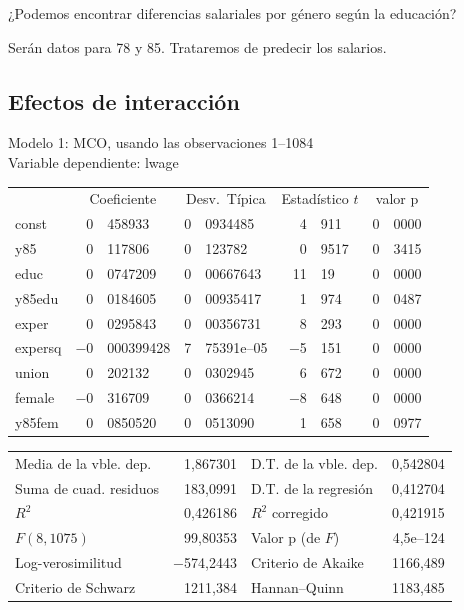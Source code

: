 \begin{center}
    ¿Podemos encontrar diferencias salariales por género según la educación?
\end{center}

Serán datos para 78 y 85. Trataremos de predecir los salarios.

\subsection{Efectos de interacción}


\begin{center}

Modelo 1: MCO, usando las observaciones 1--1084\\
Variable dependiente: lwage\\

\vspace{1em}

\begin{tabular}{lr@{,}lr@{,}lr@{,}lr@{,}l}
  &
 \multicolumn{2}{c}{Coeficiente} &
  \multicolumn{2}{c}{Desv.\ Típica} &
   \multicolumn{2}{c}{Estadístico $t$} &
    \multicolumn{2}{c}{valor p} \\[1ex]
const &
  0&458933 &
    0&0934485 &
      4&911 &
        0&0000 \\
y85 &
  0&117806 &
    0&123782 &
      0&9517 &
        0&3415 \\
educ &
  0&0747209 &
    0&00667643 &
      11&19 &
        0&0000 \\
y85edu &
  0&0184605 &
    0&00935417 &
      1&974 &
        0&0487 \\
exper &
  0&0295843 &
    0&00356731 &
      8&293 &
        0&0000 \\
expersq &
  $-$0&000399428 &
    7&75391\textrm{e--05} &
      $-$5&151 &
        0&0000 \\
union &
  0&202132 &
    0&0302945 &
      6&672 &
        0&0000 \\
female &
  $-$0&316709 &
    0&0366214 &
      $-$8&648 &
        0&0000 \\
y85fem &
  0&0850520 &
    0&0513090 &
      1&658 &
        0&0977 \\
\end{tabular}

\vspace{1ex}
\begin{tabular}{lrlr}
Media de la vble. dep. &  1,867301 & D.T. de la vble. dep. &  0,542804 \\
Suma de cuad. residuos &  183,0991 & D.T. de la regresión &  0,412704 \\
$R^2$ &  0,426186 & $R^2$ corregido &  0,421915 \\
$F(8, 1075)$ &  99,80353 & Valor p (de $F$) &  4,5\textrm{e--124} \\
Log-verosimilitud & $-$574,2443 & Criterio de Akaike &  1166,489 \\
Criterio de Schwarz &  1211,384 & Hannan--Quinn &  1183,485 \\
\end{tabular}
\end{center}

